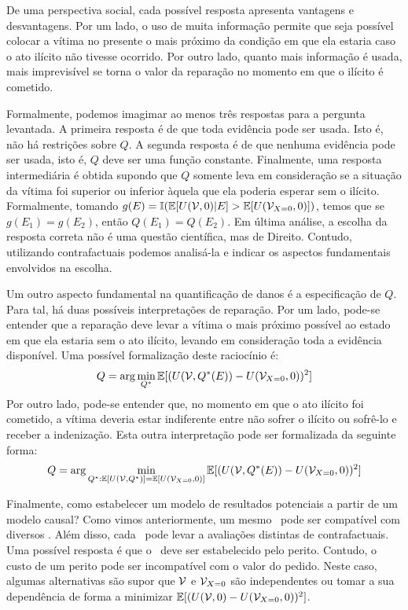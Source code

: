 De uma perspectiva social, 
cada possível resposta apresenta
vantagens e desvantagens.
Por um lado, o uso de muita informação permite que
seja possível colocar a vítima no presente
o mais próximo da condição em que ela estaria
caso o ato ilícito não tivesse ocorrido.
Por outro lado, quanto mais informação é usada,
mais imprevisível se torna o valor da reparação
no momento em que o ilícito é cometido.

Formalmente, podemos imagimar 
ao menos três respostas para a pergunta levantada.
A primeira resposta é de que toda evidência pode ser usada.
Isto é, não há restrições sobre $Q$.
A segunda resposta é de que nenhuma evidência pode ser usada,
isto é, $Q$ deve ser uma função constante.
Finalmente, uma resposta intermediária é obtida supondo que
$Q$ somente leva em consideração se a situação 
da vítima foi superior ou inferior àquela que
ela poderia esperar sem o ilícito.
Formalmente, tomando
$g(E) = {\mathbb I}({\mathbb E}[U({\mathcal V},0)|E] > {\mathbb E}[U({\mathcal V}_{X=0},0)])$,
temos que se $g(E_1) = g(E_2)$, então
$Q(E_1) = Q(E_2)$.
Em última análise, a escolha da resposta correta
não é uma questão científica, mas de Direito.
Contudo, utilizando contrafactuais podemos
analisá-la e indicar os aspectos fundamentais
envolvidos na escolha.

Um outro aspecto fundamental 
na quantificação de danos é a especificação de $Q$.
Para tal, há duas possíveis interpretações de reparação.
Por um lado, pode-se entender que
a reparação deve levar a vítima o mais próximo possível
ao estado em que ela estaria sem o ato ilícito,
levando em consideração toda a evidência disponível.
Uma possível formalização deste raciocínio é:
\begin{align*}
 Q = \arg\min_{Q^*}{\mathbb E}[(U({\mathcal V},Q^*(E)) - U({\mathcal V}_{X=0},0))^2]
\end{align*}
Por outro lado, pode-se entender que,
no momento em que o ato ilícito foi cometido,
a vítima deveria estar indiferente entre
não sofrer o ilícito ou sofrê-lo e receber a indenização.
Esta outra interpretação pode ser formalizada da seguinte forma:
\begin{align*}
 Q = \arg\min_{Q^*: {\mathbb E}[U({\mathcal V},Q^*)] = {\mathbb E}[U({\mathcal V}_{X=0},0)]}{\mathbb E}[(U({\mathcal V},Q^*(E)) - U({\mathcal V}_{X=0},0))^2]
\end{align*}

Finalmente, como estabelecer 
um modelo de resultados potenciais 
a partir de um modelo causal?
Como vimos anteriormente, 
um mesmo \CM \ pode ser compatível com
diversos \SCM. Além disso,
cada \SCM \ pode levar a avaliações
distintas de contrafactuais.
Uma possível resposta é que
o \SCM \ deve ser estabelecido pelo perito.
Contudo, o custo de um perito pode ser
incompatível com o valor do pedido.
Neste caso, algumas alternativas são supor que
${\mathcal V}$ e ${\mathcal V}_{X=0}$ são independentes ou
tomar a sua dependência de forma a minimizar
${\mathbb E}[(U({\mathcal V},0)-U({\mathcal V}_{X=0},0))^2]$.

